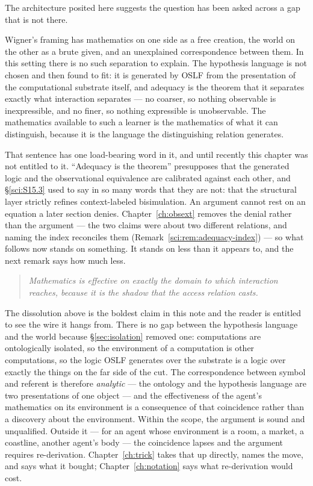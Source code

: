 The architecture posited here suggests the question has been asked across a gap that is not there.

Wigner's framing has mathematics on one side as a free creation, the world on the other as a brute
given, and an unexplained correspondence between them. In this setting there is no such separation to
explain. The hypothesis language is not chosen and then found to fit: it is generated by OSLF from the
presentation of the computational substrate itself, and adequacy is the theorem that it separates
exactly what interaction separates --- no coarser, so nothing observable is inexpressible, and no
finer, so nothing expressible is unobservable. The mathematics available to such a learner is the
mathematics of what it can distinguish, because it is the language the distinguishing relation
generates.

That sentence has one load-bearing word in it, and until recently this chapter was not entitled to it.
``Adequacy is the theorem'' presupposes that the generated logic and the observational equivalence are
calibrated against each other, and \S\ref{sci:S15.3} used to say in so many words that they are not:
that the structural layer strictly refines context-labeled bisimulation. An argument cannot rest on an
equation a later section denies. Chapter~\ref{ch:obsext} removes the denial rather than the argument
--- the two claims were about two different relations, and naming the index reconciles them
(Remark~\ref{sci:rem:adequacy-index}) --- so what follows now stands on something. It stands on less
than it appears to, and the next remark says how much less.

\begin{quote}
\itshape Mathematics is effective on exactly the domain to which interaction reaches, because it is
the shadow that the access relation casts.
\end{quote}

\begin{remark}
\label{sci:rem:wigner-scope}
The dissolution above is the boldest claim in this note and the reader is entitled to see the wire it hangs
from. There is no gap between the hypothesis language and the world because \S\ref{sec:isolation} removed
one: computations are ontologically isolated, so the environment of a computation is other computations,
so the logic OSLF generates over the substrate is a logic over exactly the things on the far side of the
cut. The correspondence between symbol and referent is therefore \emph{analytic} --- the ontology and the
hypothesis language are two presentations of one object --- and the effectiveness of the agent's
mathematics on its environment is a consequence of that coincidence rather than a discovery about the
environment. Within the scope, the argument is sound and unqualified. Outside it --- for an agent whose
environment is a room, a market, a coastline, another agent's body --- the coincidence lapses and the
argument requires re-derivation. Chapter~\ref{ch:trick} takes that up directly, names the move, and says
what it bought; Chapter~\ref{ch:notation} says what re-derivation would cost.
\end{remark}

